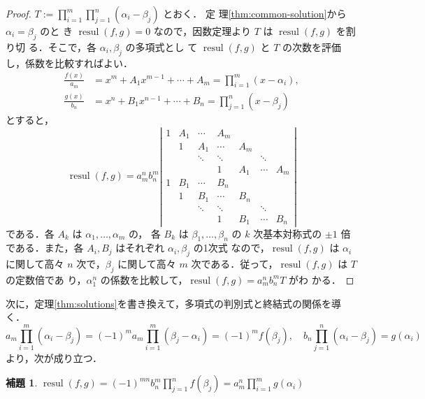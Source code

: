 \documentclass[12pt, uplatex, dvipdfmx]{jsarticle}
\newcommand{\ds}{\displaystyle}
\theoremstyle{definition}
\newtheorem{lemma}{補題}
\DeclareMathOperator{\resul}{resul}
\begin{document}
\begin{proof}
  $\ds T:=\prod_{i=1}^{m}\prod_{j=1}^{n}(\alpha_i-\beta_j)$ とおく． 定
  理\ref{thm:common-solution}から $\alpha_i=\beta_j$ のと
  き $\resul(f,g)=0$ なので，因数定理より $T$ は $\resul(f,g)$ を割り切
  る．そこで，各 $\alpha_i, \beta_j$ の多項式とし
  て $\resul(f,g)$ と $T$ の次数を評価し，係数を比較すればよい．
  \[
    \begin{aligned}
      \frac{f(x)}{a_m} &= x^m + A_{1} x^{m-1} + \cdots + A_m = \prod_{i=1}^{m}(x-\alpha_i),\\
      \frac{g(x)}{b_n} &= x^n + B_{1} x^{n-1} + \cdots + B_n = \prod_{j=1}^{n}(x-\beta_j)
    \end{aligned}
  \]
  とすると，
  \[
    \resul(f,g) = a_m^n b_n^m \left|
      \begin{array}{ccccccc}
        1 & A_{1} & \cdots  & A_m& & & \\
          & 1 & A_{1} & \cdots  & A_m& & \\
          & & \ddots & \ddots & & \ddots &  \\
          & & & 1 & A_{1} & \cdots &  A_m\\
        1 & B_{1} & \cdots & B_n & & &\\
          & 1 & B_{1} & \cdots & B_n & &\\
          & & \ddots & \ddots & & \ddots &\\
          & & & 1 & B_{1} & \cdots & B_n
      \end{array}
    \right|
  \]
  である．各 $A_k$ は $\alpha_1, \ldots, \alpha_m$ の，
  各 $B_k$ は $\beta_1, \ldots, \beta_n$ の $k$ 次基本対称式の $\pm 1$
  倍である．また，各 $A_i, B_j$ はそれぞれ $\alpha_i, \beta_j$ の1次式
  なので，$\resul(f,g)$ は $\alpha_i$ に関して高々 $n$ 次で，$\beta_j$
  に関して高々 $m$ 次である．従って，$\resul(f,g)$ は $T$ の定数倍であ
  り，$\alpha_1^n$ の係数を比較して，$\resul(f,g) = a_m^n b_n^m T$ がわ
  かる．
\end{proof}

次に，定理\ref{thm:solutions}を書き換えて，多項式の判別式と終結式の関係を導く．
\[
  a_m \prod_{i=1}^{m}(\alpha_i-\beta_j)= (-1)^m a_m \prod_{i=1}^{m}(\beta_j-\alpha_i)= (-1)^m f(\beta_j), \quad
  b_n \prod_{j=1}^{n}(\alpha_i-\beta_j) = g(\alpha_i)
\]
より，次が成り立つ．


\begin{lemma}\label{lem:resul-trans}
  $\ds \resul(f,g) = (-1)^{mn}b_n^m \prod_{j=1}^{n}f(\beta_j) = a_m^n \prod_{i=1}^{m}g(\alpha_i)$
\end{lemma}
\end{document}
